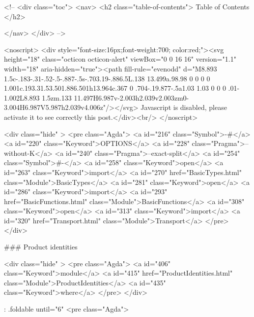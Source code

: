   <!-- 
  <div class="toc">
    <nav>
    <h2 class="table-of-contents"> Table of Contents </h2>
      

    </nav>
  </div>
   -->

  <noscript>
  <div style="font-size:16px;font-weight:700; color:red;"><svg height="18" class="octicon octicon-alert" viewBox="0 0 16 16" version="1.1" width="18" aria-hidden="true"><path fill-rule="evenodd" d="M8.893 1.5c-.183-.31-.52-.5-.887-.5s-.703.19-.886.5L.138 13.499a.98.98 0 0 0 0 1.001c.193.31.53.501.886.501h13.964c.367 0 .704-.19.877-.5a1.03 1.03 0 0 0 .01-1.002L8.893 1.5zm.133 11.497H6.987v-2.003h2.039v2.003zm0-3.004H6.987V5.987h2.039v4.006z"/></svg> Javascript is disabled, please activate it to see correctly this post.</div><br/>
  </noscript>

  <div class="hide" >
<pre class="Agda">
<a id="216" class="Symbol">{-#</a> <a id="220" class="Keyword">OPTIONS</a> <a id="228" class="Pragma">--without-K</a> <a id="240" class="Pragma">--exact-split</a> <a id="254" class="Symbol">#-}</a>
<a id="258" class="Keyword">open</a> <a id="263" class="Keyword">import</a> <a id="270" href="BasicTypes.html" class="Module">BasicTypes</a>
<a id="281" class="Keyword">open</a> <a id="286" class="Keyword">import</a> <a id="293" href="BasicFunctions.html" class="Module">BasicFunctions</a>
<a id="308" class="Keyword">open</a> <a id="313" class="Keyword">import</a> <a id="320" href="Transport.html" class="Module">Transport</a>
</pre>
</div>

### Product identities

<div class="hide" >
<pre class="Agda">
<a id="406" class="Keyword">module</a>
  <a id="415" href="ProductIdentities.html" class="Module">ProductIdentities</a>
  <a id="435" class="Keyword">where</a>
</pre>
</div>


{: .foldable until="6"}
<pre class="Agda">

